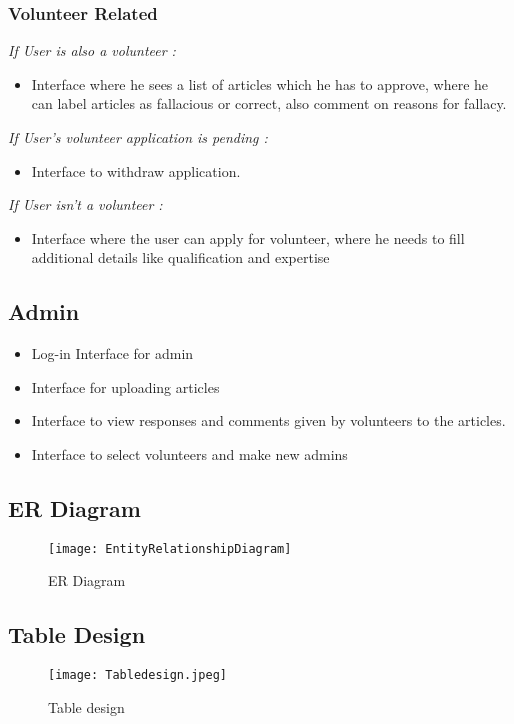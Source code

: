 \documentclass[titlepage,12pt]{article}
\begin{document}
\subsubsection{ Volunteer Related }
        \noindent
        \textit{ If User is also a volunteer : }
        \begin{itemize}
             \setlength\itemsep{0.3em}
            \item Interface where he sees a list of articles which he has to approve, where he can label articles as fallacious or correct, also comment on reasons for fallacy.
        \end{itemize}
        \noindent
        \textit{ If User's volunteer application is pending : }
        \begin{itemize}
            \item Interface to withdraw application.
        \end{itemize}
        \newpage
        \noindent
        \textit{ If User isn't a volunteer : }
        \begin{itemize}
             \setlength\itemsep{0.3em}
            \item Interface where the user can apply for volunteer, where he needs to fill additional details like qualification and expertise
        \end{itemize}
\subsection{Admin}
\begin{itemize}
     \setlength\itemsep{0.3em}
    \item Log-in Interface for admin 
    \item Interface for uploading articles
    \item  Interface to view responses and comments given by volunteers to the articles.
    \item Interface to select volunteers and make new admins
\end{itemize}
\subsection{ER Diagram}
\begin{figure}[H]
    \centering
    \texttt{[image: EntityRelationshipDiagram]}
    \caption{ER Diagram}
    \label{fig:er_diagram}
\end{figure}
\newpage
\subsection{Table Design}
\begin{figure}[H]
    \centering
    \texttt{[image: Tabledesign.jpeg]}
    \caption{Table design}
    \label{fig:table_design}
\end{figure}
\end{document}
